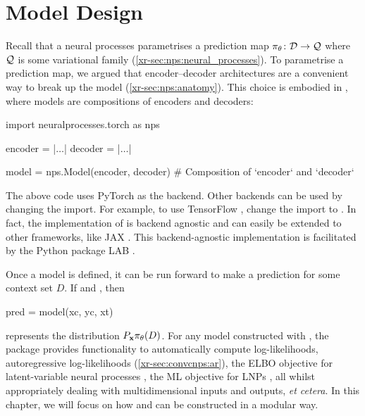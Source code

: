 \documentclass[12pt, twoside]{report}
\newcommand{\xrprefix}[1]{xr-#1}
\begin{document}
\section{Model Design}
\label{sec:software:model_design}

Recall that a neural processes parametrises a prediction map $\pi_\theta\colon \mathcal{D} \to \mathcal{Q}$ where $\mathcal{Q}$ is some variational family (\cref{\xrprefix{sec:nps:neural_processes}}).
To parametrise a prediction map, we argued that encoder--decoder architectures are a convenient way to break up the model (\cref{\xrprefix{sec:nps:anatomy}}).
This choice is embodied in , where models are compositions of encoders and decoders:
\begin{pythoncode}{\small}{}
import neuralprocesses.torch as nps

encoder = |$\ldots$|
decoder = |$\ldots$|

model = nps.Model(encoder, decoder)  # Composition of `encoder` and `decoder`
\end{pythoncode}
The above code uses PyTorch \parencite{Paszke:2019:PyTorch_An_Imperative_Style_High-Performance} as the backend.
Other backends can be used by changing the import.
For example, to use TensorFlow \parencite{Abadi:2016:TensorFlow_A_System_for_Large-Scale}, change the import to .
In fact, the implementation of  is backend agnostic and can easily be extended to other frameworks, like JAX \parencite{Bradbury:2018:JAX}.
This backend-agnostic implementation is facilitated by the Python package LAB \parencite{Bruinsma:LAB}.

Once a model is defined, it can be run forward to make a prediction for some context set $D$.
If  and , then
\begin{pythoncode}{\small}{}
pred = model(xc, yc, xt)
\end{pythoncode}
represents the distribution $P_{\mathbf{x}} \pi_\theta(D)$.
For any model constructed with , the package provides functionality to automatically compute log-likelihoods, autoregressive log-likelihoods (\cref{\xrprefix{sec:convcnps:ar}}), the ELBO objective for latent-variable neural processes \parencite[LNPs;][]{Garnelo:2018:Neural_Processes}, the ML objective for LNPs \parencite{Foong:2020:Meta-Learning_Stationary_Stochastic_Process_Prediction}, all whilst appropriately dealing with multidimensional inputs and outputs, \textit{et cetera}.
In this chapter, we will focus on how  and  can be constructed in a modular way.
\end{document}
